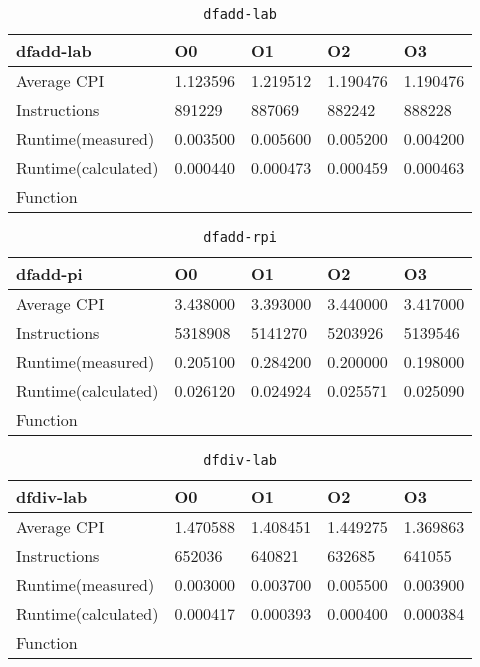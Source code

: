\begin{table}[ht!]
\centering
\caption{\texttt{dfadd-lab}}
\label{tab:dfadd-lab}
\begin{tabular}{|l|l|l|l|l|}
\hline
\textbf{dfadd-lab}	&	\textbf{O0}	&	\textbf{O1}	&	\textbf{O2}	&	\textbf{O3}	\\\hline\hline
Average CPI	&	1.123596	&	1.219512	&	1.190476	&	1.190476	\\\hline
Instructions	&	891229	&	887069	&	882242	&	888228	\\\hline
Runtime(measured)	&	0.003500	&	0.005600	&	0.005200	&	0.004200	\\\hline
Runtime(calculated)	&	0.000440	&	0.000473	&	0.000459	&	0.000463	\\\hline
Function	&		&		&		&		\\\hline
\end{tabular}
\end{table}
\begin{table}[ht!]
\centering
\caption{\texttt{dfadd-rpi}}
\label{tab:dfadd-rpi}
\begin{tabular}{|l|l|l|l|l|}
\hline
\textbf{dfadd-pi}	&	\textbf{O0}	&	\textbf{O1}	&	\textbf{O2}	&	\textbf{O3}	\\\hline\hline
Average CPI	&	3.438000	&	3.393000	&	3.440000	&	3.417000	\\\hline
Instructions	&	5318908	&	5141270	&	5203926	&	5139546	\\\hline
Runtime(measured)	&	0.205100	&	0.284200	&	0.200000	&	0.198000	\\\hline
Runtime(calculated)	&	0.026120	&	0.024924	&	0.025571	&	0.025090	\\\hline
Function	&		&		&		&		\\\hline
\end{tabular}
\end{table}
\begin{table}[ht!]
\centering
\caption{\texttt{dfdiv-lab}}
\label{tab:dfdiv-lab}
\begin{tabular}{|l|l|l|l|l|}
\hline
\textbf{dfdiv-lab}	&	\textbf{O0}	&	\textbf{O1}	&	\textbf{O2}	&	\textbf{O3}	\\\hline\hline
Average CPI	&	1.470588	&	1.408451	&	1.449275	&	1.369863	\\\hline
Instructions	&	652036	&	640821	&	632685	&	641055	\\\hline
Runtime(measured)	&	0.003000	&	0.003700	&	0.005500	&	0.003900	\\\hline
Runtime(calculated)	&	0.000417	&	0.000393	&	0.000400	&	0.000384	\\\hline
Function	&		&		&		&		\\\hline
\end{tabular}
\end{table}

